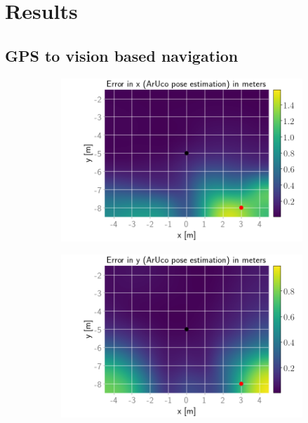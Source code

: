 \documentclass[../Head/report.tex]{subfiles}
\begin{document}
\section{Results}
\label{sec:results}

\subsection{GPS to vision based navigation}

\begin{figure}[H]
    \centering
    \begin{subfigure}[t]{.337\textwidth}
        \centering
        \includegraphics[width=\textwidth]{../Figures/GPS2Vision_pose_estimation_test/test1_aruco_board_width_0.2_space_0.1/aruco_pose_estimation_error_x.png}
        \caption{}
        \label{fig:GPS2Vision_pose_estimation_test1_error_x}
    \end{subfigure}
    \hspace{-0.9em}
    \begin{subfigure}[t]{.337\textwidth}
        \centering
        \includegraphics[width=\textwidth]{../Figures/GPS2Vision_pose_estimation_test/test1_aruco_board_width_0.2_space_0.1/aruco_pose_estimation_error_y.png}

\end{subfigure}
\end{figure}
\end{document}
